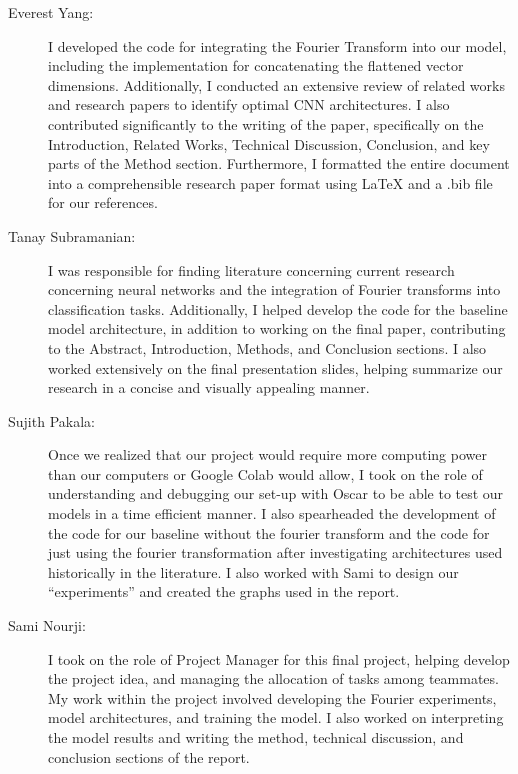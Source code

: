 \begin{description}

\item[Everest Yang:] I developed the code for integrating the Fourier Transform into our model, including the implementation for concatenating the flattened vector dimensions. Additionally, I conducted an extensive review of related works and research papers to identify optimal CNN architectures. I also contributed significantly to the writing of the paper, specifically on the Introduction, Related Works, Technical Discussion, Conclusion, and key parts of the Method section. Furthermore, I formatted the entire document into a comprehensible research paper format using LaTeX and a .bib file for our references.

\item[Tanay Subramanian:] I was responsible for finding literature concerning current research concerning neural networks and the integration of Fourier transforms into classification tasks. Additionally, I helped develop the code for the baseline model architecture, in addition to working on the final paper, contributing to the Abstract, Introduction, Methods, and Conclusion sections. I also worked extensively on the final presentation slides, helping summarize our research in a concise and visually appealing manner.

\item[Sujith Pakala:] Once we realized that our project would require more computing power than our computers or Google Colab would allow, I took on the role of understanding and debugging our set-up with Oscar to be able to test our models in a time efficient manner. I also spearheaded the development of the code for our baseline without the fourier transform and the code for just using the fourier transformation after investigating architectures used historically in the literature. I also worked with Sami to design our “experiments” and created the graphs used in the report. 

\item[Sami Nourji:] I took on the role of Project Manager for this final project, helping develop the project idea, and managing the allocation of tasks among teammates. My work within the project involved developing the Fourier experiments, model architectures, and training the model. I also worked on interpreting the model results and writing the method, technical discussion, and conclusion sections of the report.



\end{description}


